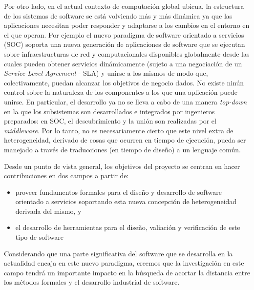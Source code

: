\documentclass{article}
\begin{document}
  Por otro lado, en el actual contexto de computaci\'on global ubicua, la estructura de los sistemas de software se est\'a volviendo m\'as y m\'as din\'amica ya que las aplicaciones necesitan poder responder y adaptarse a los cambios en el entorno en el que operan. Por ejemplo el nuevo paradigma de software orientado a servicios (SOC) soporta una nueva generaci\'on de aplicaciones de software que se ejecutan  sobre infraestructuras de red y computacionales disponibles globalmente desde las cuales pueden obtener servicios din\'amicamente (sujeto a una negociaci\'on de un \emph{Service Level Agreement} - SLA) y unirse a los mismos de modo que, colectivamente, puedan alcanzar los objetivos de negocio dados. No existe nin\'un control sobre la naturaleza de los componentes a los que una aplicaci\'on puede unirse. En particular, el desarrollo ya no se lleva a cabo de una manera \emph{top-down} en la que los subsistemas son desarrollados e integrados por ingenieros preparados: en SOC, el descubrimiento y la uni\'on 
son realizadas por el \emph{middleware}. Por lo tanto, no es necesariamente cierto que este nivel extra de heterogeneidad, derivado de cosas que ocurren en tiempo de ejecuci\'on, pueda ser manejado a trav\'es de traducciones (en tiempo de dise\~no) a un lenguaje com\'un. 
  
  Desde un punto de vista general, los objetivos del proyecto se centran en hacer contribuciones en dos campos a partir de:
  \begin{itemize}
   \item proveer fundamentos formales para el dise\~no y desarrollo de software orientado a servicios soportando esta nueva concepci\'on de heterogeneidad derivada del mismo, y
   \item el desarrollo de herramientas para el dise\~no, valiaci\'on y verificaci\'on de este tipo de software
  \end{itemize}

  Considerando que una parte significativa del software que se desarrolla en la actualidad encaja en este nuevo paradigma, creemos que la investigaci\'on en este campo tendr\'a un importante impacto en la b\'usqueda de acortar la distancia entre los m\'etodos formales y el desarrollo industrial de software.
  
\end{document}
